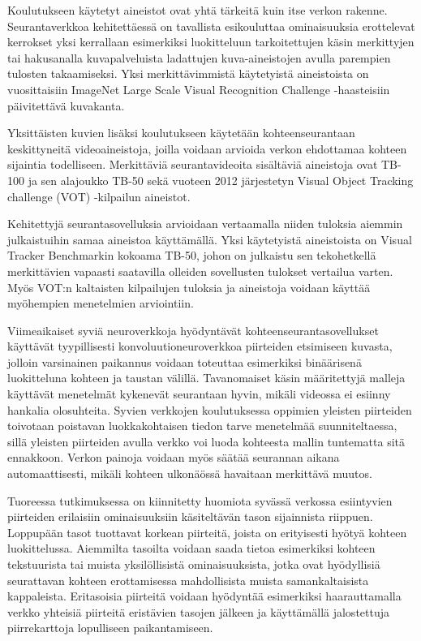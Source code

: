 Koulutukseen käytetyt aineistot ovat yhtä tärkeitä kuin itse verkon rakenne. Seurantaverkkoa
kehitettäessä on tavallista esikouluttaa ominaisuuksia erottelevat kerrokset yksi kerrallaan
esimerkiksi luokitteluun tarkoitettujen käsin merkittyjen tai hakusanalla kuvapalveluista
ladattujen kuva-aineistojen avulla parempien tulosten takaamiseksi. Yksi merkittävimmistä
käytetyistä aineistoista on vuosittaisiin ImageNet Large Scale Visual Recognition Challenge
-haasteisiin päivitettävä kuvakanta.

Yksittäisten kuvien lisäksi koulutukseen käytetään kohteenseurantaan keskittyneitä
videoaineistoja, joilla voidaan arvioida verkon ehdottamaa kohteen sijaintia todelliseen.
Merkittäviä seurantavideoita sisältäviä aineistoja ovat TB-100 ja sen alajoukko TB-50 sekä
vuoteen 2012 järjestetyn Visual Object Tracking challenge (VOT) -kilpailun aineistot.

Kehitettyjä seurantasovelluksia arvioidaan vertaamalla niiden tuloksia aiemmin julkaistuihin
samaa aineistoa käyttämällä. Yksi käytetyistä aineistoista on Visual Tracker Benchmarkin kokoama
TB-50, johon on julkaistu sen tekohetkellä merkittävien vapaasti saatavilla olleiden sovellusten
tulokset vertailua varten. Myös VOT:n kaltaisten kilpailujen tuloksia ja aineistoja voidaan
käyttää myöhempien menetelmien arviointiin.

Viimeaikaiset syviä neuroverkkoja hyödyntävät kohteenseurantasovellukset käyttävät
tyypillisesti konvoluutioneuroverkkoa piirteiden etsimiseen kuvasta, jolloin varsinainen
paikannus voidaan toteuttaa esimerkiksi binäärisenä luokitteluna kohteen ja taustan
välillä. Tavanomaiset käsin määritettyjä malleja käyttävät menetelmät kykenevät seurantaan
hyvin, mikäli videossa ei esiinny hankalia olosuhteita. Syvien verkkojen koulutuksessa
oppimien yleisten piirteiden toivotaan poistavan luokkakohtaisen tiedon tarve menetelmää
suunniteltaessa, sillä yleisten piirteiden avulla verkko voi luoda kohteesta mallin
tuntematta sitä ennakkoon. Verkon painoja voidaan myös säätää seurannan aikana automaattisesti,
mikäli kohteen ulkonäössä havaitaan merkittävä muutos.

Tuoreessa tutkimuksessa on kiinnitetty huomiota syvässä verkossa esiintyvien piirteiden
erilaisiin ominaisuuksiin käsiteltävän tason sijainnista riippuen. Loppupään tasot
tuottavat korkean piirteitä, joista on erityisesti hyötyä kohteen luokittelussa. Aiemmilta
tasoilta voidaan saada tietoa esimerkiksi kohteen tekstuurista tai muista yksilöllisistä
ominaisuuksista, jotka ovat hyödyllisiä seurattavan kohteen erottamisessa mahdollisista
muista samankaltaisista kappaleista. Eritasoisia piirteitä voidaan hyödyntää esimerkiksi
haarauttamalla verkko yhteisiä piirteitä eristävien tasojen jälkeen ja käyttämällä
jalostettuja piirrekarttoja lopulliseen paikantamiseen.


